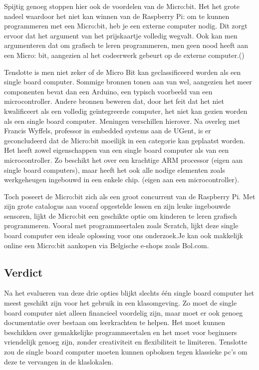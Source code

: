 Spijtig genoeg stoppen hier ook de voordelen van de Micro:bit. Het het grote nadeel waardoor het niet kan winnen van de Raspberry Pi: om te kunnen programmeren met een Micro:bit, heb je een externe computer nodig. Dit zorgt ervoor dat het argument van het prijskaartje volledig wegvalt. Ook kan men argumenteren dat om grafisch te leren programmeren, men geen nood heeft aan een Micro: bit, aangezien al het codeerwerk gebeurt op de externe computer.(\cite{Singapore})

Tenslotte is men niet zeker of de Micro Bit kan geclassificeerd worden als een single board computer. Sommige bronnen tonen aan van wel, aangezien het meer componenten bevat dan een Arduino, een typisch voorbeeld van een microcontroller. Andere bronnen beweren dat, door het feit dat het niet kwalificeert als een volledig geïntegreerde computer, het niet kan gezien worden als een single board computer. Meningen verschillen hierover. 
Na overleg met Francis Wyffels, professor in embedded systems aan de UGent, is er geconcludeerd dat de Micro:bit moeilijk in een categorie kan geplaatst worden. Het heeft zowel eigenschappen van een single board computer als van een microcontroller. Zo beschikt het over een krachtige ARM processor (eigen aan single board computers), maar heeft het ook alle nodige elementen zoals werkgeheugen ingebouwd in een enkele chip. (eigen aan een microcontroller). 

Toch poseert de Micro:bit zich als een groot concurrent van de Raspberry Pi. Met zijn grote catalogus aan vooraf opgestelde lessen en zijn leuke ingebouwde sensoren, lijkt de Micro:bit een geschikte optie om kinderen te leren grafisch programmeren. Vooral met programmeertalen zoals Scratch, lijkt deze single board computer een ideale oplossing voor ons onderzoek.Je kan ook makkelijk online een Micro:bit aankopen via Belgische e-shops zoals Bol.com. 

\subsection{Verdict}

Na het evalueren van deze drie opties blijkt slechts één single board computer het meest geschikt zijn voor het gebruik in een klasomgeving. Zo moet de single board computer niet alleen financieel voordelig zijn, maar moet er ook genoeg documentatie over bestaan om leerkrachten te helpen. Het moet kunnen beschikken over gemakkelijke programmeertalen en het moet voor beginners vriendelijk genoeg zijn, zonder creativiteit en flexibiliteit te limiteren.
Tenslotte zou de single board computer moeten kunnen opboksen tegen klassieke pc’s om deze te vervangen in de klaslokalen.

